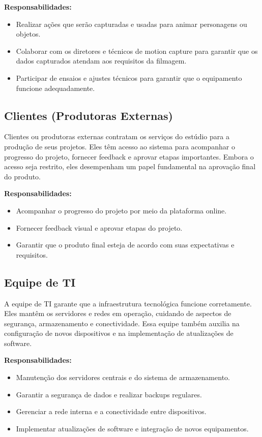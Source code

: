 \textbf{Responsabilidades:}
\begin{itemize}
  \item Realizar ações que serão capturadas e usadas para animar personagens ou objetos.
  \item Colaborar com os diretores e técnicos de motion capture para garantir que os dados capturados atendam aos requisitos da filmagem.
  \item Participar de ensaios e ajustes técnicos para garantir que o equipamento funcione adequadamente.
\end{itemize}

\subsection{Clientes (Produtoras Externas)}
Clientes ou produtoras externas contratam os serviços do estúdio para a produção de seus projetos. Eles têm acesso ao sistema para acompanhar o progresso do projeto, fornecer feedback e aprovar etapas importantes. Embora o acesso seja restrito, eles desempenham um papel fundamental na aprovação final do produto.

\textbf{Responsabilidades:}
\begin{itemize}
  \item Acompanhar o progresso do projeto por meio da plataforma online.
  \item Fornecer feedback visual e aprovar etapas do projeto.
  \item Garantir que o produto final esteja de acordo com suas expectativas e requisitos.
\end{itemize}

\subsection{Equipe de TI}
A equipe de TI garante que a infraestrutura tecnológica funcione corretamente. Eles mantêm os servidores e redes em operação, cuidando de aspectos de segurança, armazenamento e conectividade. Essa equipe também auxilia na configuração de novos dispositivos e na implementação de atualizações de software.

\textbf{Responsabilidades:}
\begin{itemize}
  \item Manutenção dos servidores centrais e do sistema de armazenamento.
  \item Garantir a segurança de dados e realizar backups regulares.
  \item Gerenciar a rede interna e a conectividade entre dispositivos.
  \item Implementar atualizações de software e integração de novos equipamentos.
\end{itemize}

